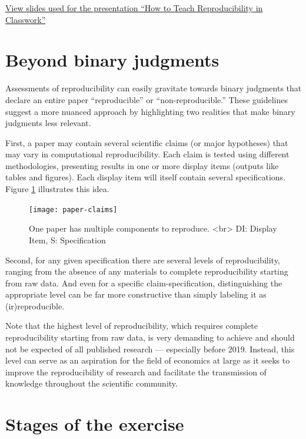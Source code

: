 \documentclass[]{book}
\begin{document}
\href{https://bitss.github.io/WEAI2020_slides/}{View slides used for the presentation ``How to Teach Reproducibility in Classwork''}

\hypertarget{beyond-binary-judgments}{%
\section*{Beyond binary judgments}\label{beyond-binary-judgments}}

Assessments of reproducibility can easily gravitate towards binary judgments that declare an entire paper ``reproducible'' or ``non-reproducible.'' These guidelines suggest a more nuanced approach by highlighting two realities that make binary judgments less relevant.

First, a paper may contain several scientific claims (or major hypotheses) that may vary in computational reproducibility. Each claim is tested using different methodologies, presenting results in one or more display items (outputs like tables and figures). Each display item will itself contain several specifications. Figure \ref{fig:diagram} illustrates this idea.

\begin{figure}
\texttt{[image: paper-claims]} \caption{One paper has multiple components to reproduce. <br> DI: Display Item, S: Specification }\label{fig:diagram}
\end{figure}

Second, for any given specification there are several levels of reproducibility, ranging from the absence of any materials to complete reproducibility starting from raw data. And even for a specific claim-specification, distinguishing the appropriate level can be far more constructive than simply labeling it as (ir)reproducible.

Note that the highest level of reproducibility, which requires complete reproducibility starting from raw data, is very demanding to achieve and should not be expected of all published research --- especially before 2019. Instead, this level can serve as an aspiration for the field of economics at large as it seeks to improve the reproducibility of research and facilitate the transmission of knowledge throughout the scientific community.

\hypertarget{stages-of-the-exercise}{%
\section*{Stages of the exercise}\label{stages-of-the-exercise}}
\end{document}
